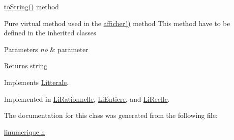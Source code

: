 \hyperlink{class_li_numerique_ad40fe29de93bcf18cc2cd088abcb728b}{to\+String()} method 

Pure virtual method used in the \hyperlink{class_litterale_ae33587fb3c4a929c9ee29d9c6b49aea6}{afficher()} method This method have to be defined in the inherited classes


\begin{DoxyParams}{Parameters}
{\em no} & parameter \\
\hline
\end{DoxyParams}
\begin{DoxyReturn}{Returns}
string 
\end{DoxyReturn}


Implements \hyperlink{class_litterale_a3041839e5494df2c93bff2c5cb83ce1f}{Litterale}.



Implemented in \hyperlink{class_li_rationnelle_a2ef7aa4c19e3433794c251cc61296f58}{Li\+Rationnelle}, \hyperlink{class_li_entiere_a48fceee2e4f1d481b923ebb28a085baf}{Li\+Entiere}, and \hyperlink{class_li_reelle_ad78df00afab6b86f6b0ec966f848c872}{Li\+Reelle}.



The documentation for this class was generated from the following file\+:\begin{DoxyCompactItemize}
\item 
\hyperlink{linumerique_8h}{linumerique.\+h}\end{DoxyCompactItemize}
